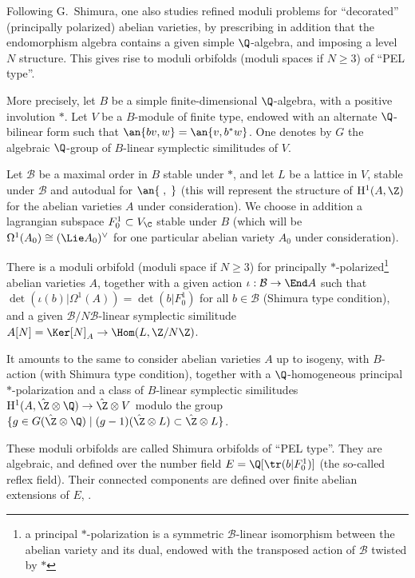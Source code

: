 \begin{para}\label{para:1.1.4}
 Following G.~Shimura, one also studies refined moduli problems for
 ``decorated'' (principally polarized) abelian varieties, by prescribing
 in addition that the endomorphism algebra contains a given simple
 $\Q$-algebra, and imposing a level $N$ structure. This gives rise to
 moduli orbifolds (\resp moduli spaces if $N\geq 3$) of ``PEL type''.

 More precisely, let $B$ be a simple finite-dimensional $\Q$-algebra,
 with a positive involution $\ast$. Let $V$ be a $B$-module of finite
 type, endowed with an alternate $\Q$-bilinear form such that
 $\an{bv,w}=\an{v,b^\ast w}$.  One denotes by $G$ the algebraic $\Q$-group of
 $B$-linear symplectic similitudes of $V$.

 Let $\mathcal{B}$ be a maximal order in $B$ stable under $\ast$, and
let $L$ be a lattice in $V$, stable under $\mathcal{B}$ and autodual for
$\an{\;,\;}$ (this will represent the structure of $\mathrm{H}^1(A,{\Z})$ for
the abelian varieties $A$ under consideration). We choose in addition a
lagrangian subspace $F^1_0\subset V_{\C}$ stable under $B$ (which
will be $\Omega^1(A_0)\cong (\Lie A_0)^\vee$ for one particular abelian
variety $A_0$ under consideration).

There is a moduli orbifold (\resp moduli space if $N\geq 3$)
for principally $\ast$-polarized\footnote{a principal
$\ast$-polarization is a symmetric $\mathcal{B}$-linear isomorphism
between the abelian variety and its dual, endowed with the transposed
action of $\mathcal{B}$ twisted by $\ast$} abelian varieties $A$,
together with a given action $\iota: \mathcal{B}\rightarrow \End A$
such that $\det(\iota(b)| \Omega^1(A))=\det(b| F^1_0)$ for all
$b\in \mathcal{B}$ (Shimura type condition), and a given
$\mathcal{B}/N\mathcal{B}$-linear symplectic similitude
$A[N]=\Ker[N]_A\rightarrow \Hom(L,{\Z}/N {\Z})$.


It amounts to the same to consider abelian varieties $A$ up to isogeny,
with $B$-action (with Shimura type condition), together with a
$\Q$-homogeneous principal $\ast$-polarization and a class of $B$-linear
symplectic similitudes $\mathrm{H}^1(A,{\hat {\Z}}\otimes
\Q)\rightarrow {\hat {\Z}}\otimes V$ modulo the group $\{g \in
G({\hat {\Z}}\otimes {\Q}) \mid (g-1)({\hat {\Z}}\otimes L)\subset {\hat
{\Z}}\otimes L\}$.

These moduli orbifolds are called Shimura orbifolds of ``PEL
type''.  They are algebraic, and defined over
 the number field 
$E={\Q}[\tr(b| F^1_0)]$ (the so-called reflex field). Their
connected components are defined over finite abelian extensions of $E$,
\cf \cite{tds}.
\end{para}

